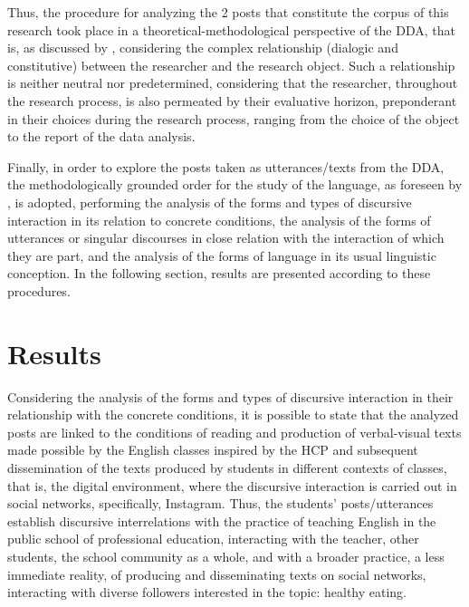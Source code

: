 \documentclass[english]{textolivre}
\begin{document}
Thus, the procedure for analyzing the 2 posts that constitute the corpus of this research took place in a theoretical-methodological perspective of the DDA, that is, as discussed by \textcite{rohling2014pesquisa}, considering the complex relationship (dialogic and constitutive) between the researcher and the research object. Such a relationship is neither neutral nor predetermined, considering that the researcher, throughout the research process, is also permeated by their evaluative horizon, preponderant in their choices during the research process, ranging from the choice of the object to the report of the data analysis.

Finally, in order to explore the posts taken as utterances/texts from the DDA, the methodologically grounded order for the study of the language, as foreseen by \textcite{volochinov2018}, is adopted, performing the analysis of the forms and types of discursive interaction in its relation to concrete conditions, the analysis of the forms of utterances or singular discourses in close relation with the interaction of which they are part, and the analysis of the forms of language in its usual linguistic conception. In the following section, results are presented according to these procedures.

\section{Results}

Considering the analysis of the forms and types of discursive interaction in their relationship with the concrete conditions, it is possible to state that the analyzed posts are linked to the conditions of reading and production of verbal-visual texts made possible by the English classes inspired by the HCP and subsequent dissemination of the texts produced by students in different contexts of classes, that is, the digital environment, where the discursive interaction is carried out in social networks, specifically, Instagram. Thus, the students’ posts/utterances establish discursive interrelations with the practice of teaching English in the public school of professional education, interacting with the teacher, other students, the school community as a whole, and with a broader practice, a less immediate reality, of producing and disseminating texts on social networks, interacting with diverse followers interested in the topic: healthy eating.
\end{document}
